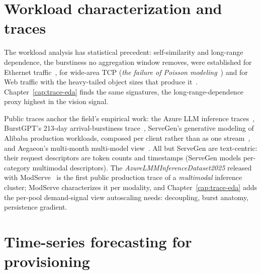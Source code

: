 \section{Workload characterization and traces}
\label{sec:rel-workload}

The workload analysis has statistical precedent: self-similarity and
long-range dependence, the burstiness no aggregation window removes,
were established for Ethernet traffic~\cite{Leland1994}, for wide-area
TCP (\emph{the failure of Poisson modeling}~\cite{Paxson1995}) and for
Web traffic with the heavy-tailed object sizes that produce
it~\cite{Crovella1997}. Chapter~\ref{cap:trace-eda} finds the same
signatures, the long-range-dependence proxy highest in the vision
signal.

Public traces anchor the field's empirical work: the Azure LLM inference
traces~\cite{Patel2024Splitwise,Stojkovic2025DynamoLLM}, BurstGPT's
213-day arrival-burstiness trace~\cite{Wang2024BurstGPT}, ServeGen's
generative modeling of Alibaba production workloads, composed per client
rather than as one stream~\cite{Xiang2025ServeGen}, and Aegaeon's
multi-month multi-model view~\cite{Xiang2025Aegaeon}. All but ServeGen
are text-centric: their request descriptors are token counts and
timestamps (ServeGen models per-category multimodal descriptors). The
\textit{AzureLMMInferenceDataset2025} released with
ModServe~\cite{Qiu2025ModServe} is the first public production trace of
a \emph{multimodal} inference cluster; ModServe characterizes it per
modality, and Chapter~\ref{cap:trace-eda} adds the per-pool
demand-signal view autoscaling needs: decoupling, burst anatomy,
persistence gradient.

\section{Time-series forecasting for provisioning}
\label{sec:rel-forecast}

